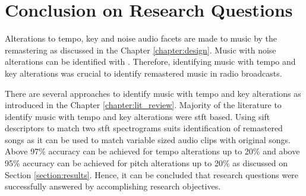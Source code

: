 \section{Conclusion on Research Questions}

Alterations to tempo, key and noise audio facets are made to music by the remastering
as discussed in the Chapter \ref{chapter:design}. Music with noise alterations can be
identified with \cite{Nishan}.
Therefore, identifying music with tempo and key alterations was crucial to identify remastered
music in radio broadcasts.

There are several approaches to identify music with tempo and key alterations as introduced in
the Chapter \ref{chapter:lit_review}. Majority of the literature to identify music with tempo and
key alterations were \ac{stft} based. Using \ac{sift} descriptors to match two \ac{stft} spectrograms
suits identification of remastered songs as it can be used to match variable sized audio clips with 
original songs. Above 97\% accuracy can be achieved for tempo alterations up to 20\% and above 95\%
accuracy can be achieved for pitch alterations up to 20\% as discussed on Section \ref{section:results}.    
Hence, it can be concluded that research questions were successfully answered by accomplishing research
objectives. 
